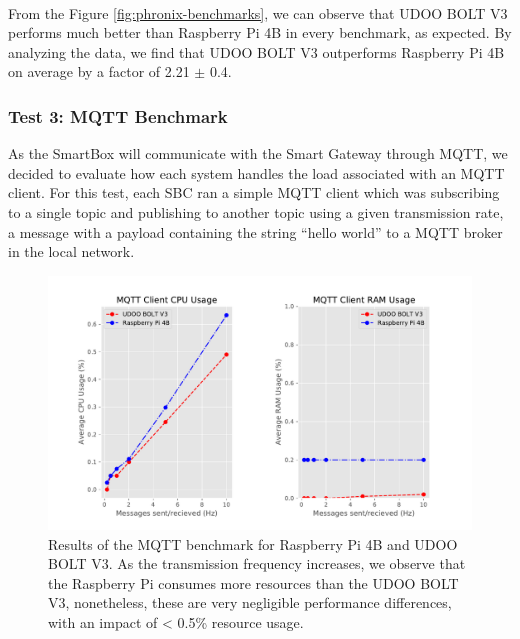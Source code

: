 \paragraph{} From the Figure \ref{fig:phronix-benchmarks}, we can observe that UDOO BOLT V3 performs much better than Raspberry Pi 4B in every benchmark, as expected. By analyzing the data, we find that UDOO BOLT V3 outperforms Raspberry Pi 4B on average by a factor of 2.21 $\pm$ 0.4.

\subsubsection{Test 3: \acs{MQTT} Benchmark}

As the SmartBox will communicate with the Smart Gateway through \acs{MQTT}, we decided to evaluate how each system handles the load associated with an \acs{MQTT} client. For this test, each \acs{SBC} ran a simple \acs{MQTT} client which was subscribing to a single topic and publishing to another topic using a given transmission rate, a message with a payload containing the string ``hello world'' to a \acs{MQTT} broker in the local network.

\begin{figure}[H]
    \centering
    \includegraphics[width=\linewidth]{images/mqtt_test_results.pdf}
    \caption[Results of the \acs{MQTT} benchmark for Raspberry Pi 4B and UDOO BOLT V3.]{Results of the \acs{MQTT} benchmark for Raspberry Pi 4B and UDOO BOLT V3. As the transmission frequency increases, we observe that the Raspberry Pi consumes more resources than the UDOO BOLT V3, nonetheless, these are very negligible performance differences, with an impact of < 0.5\% resource usage.}
    \label{fig:mqtt-tests}
\end{figure}

